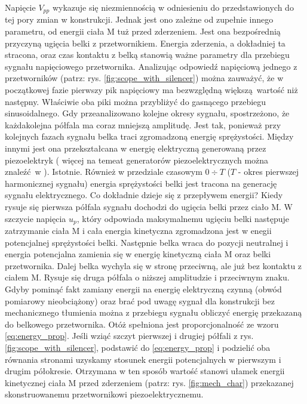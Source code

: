 \indent Napięcie $V_{pp}$ wykazuje się niezmiennością w odniesieniu do przedstawionych do tej pory zmian 
w konstrukcji. Jednak jest ono zależne od zupełnie innego parametru, od energii ciała M 
tuż przed zderzeniem. Jest ona bezpośrednią przyczyną ugięcia belki z przetwornikiem. 
Energia zderzenia, a dokładniej ta stracona, oraz czas kontaktu z belką stanowią ważne parametry 
dla przebiegu sygnału napięciowego przetwornika. Analizując odpowiedź napięciową jednego z przetworników 
(patrz: rys. \ref{fig:scope_with_silencer})
można zauważyć, że w początkowej fazie pierwszy pik napięciowy ma bezwzględną większą wartość niż następny.
Właściwie oba piki można przybliżyć do gasnącego przebiegu sinusoidalnego. Gdy przeanalizowano kolejne okresy
sygnału, spostrzeżono, że każdakolejna półfala ma coraz mniejszą amplitudę. Jest tak, ponieważ przy kolejnych
fazach sygnału belka traci zgromadzoną energię sprężystości. Między innymi jest ona przekształcana w energię
elektryczną generowaną przez piezoelektryk ( więcej na temeat generatorów piezoelektrycznych można znaleźć w 
\cite{To_Do}). Istotnie. Również w przedziale czasowym $0 \div T$ ($T$ - okres
pierwszej harmonicznej sygnału) energia sprężystości belki jest tracona na generację sygnału elektrycznego.
Co dokładnie dzieje się z przepływem energii? Kiedy rysuje się pierwsza półfala sygnału dochodzi do ugięcia
belki przez ciało M. W szczycie napięcia $u_{p}$, który odpowiada maksymalnemu ugięciu belki następuje
zatrzymanie ciała M i cała energia kinetyczna zgromadzona jest w enegii potencjalnej sprężystości belki.
Następnie belka wraca do pozycji neutralnej i energia potencjalna zamienia się w energię kinetyczną ciała M
oraz belki przetwornika. Dalej belka wychyla się w stronę przeciwną, ale już bez kontaktu z ciałem M. Rysuje się 
druga półfala o niższej amplitudzie i przeciwnym znaku. Gdyby pominąć fakt zamiany energii na energię elektryczną
czynną (obwód pomiarowy nieobciążony) oraz brać pod uwagę sygnał dla konstrukcji bez mechanicznego tłumienia
można z przebiegu sygnału obliczyć energię przekazaną do belkowego przetwornika. Otóż spełniona jest
proporcjonalność ze wzoru \ref{eq:energy_prop}. Jeśli wziąć szczyt pierwszej i drugiej półfali
z rys. \ref{fig:scope_with_silencer}, podstawić do \ref{eq:energy_prop} i podzielić oba równania
stronami uzyskamy stosunek energii potencjalnych w pierwszym i drugim półokresie. Otrzymana
w ten sposób wartość stanowi ułamek energii kinetycznej ciała M przed zderzeniem 
(patrz: rys. \ref{fig:mech_char}) przekazanej skonstruowanemu przetwornikowi piezoelektrycznemu.

